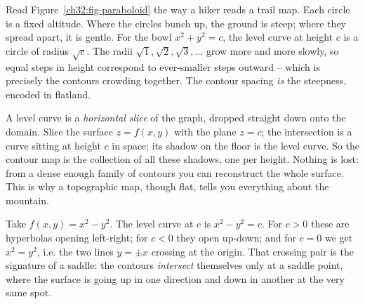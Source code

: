Read Figure~\ref{ch32:fig-paraboloid} the way a hiker reads a trail map. Each circle is a
fixed altitude. Where the circles bunch up, the ground is steep; where they spread apart, it
is gentle. For the bowl $x^2+y^2=c$, the level curve at height $c$ is a circle of radius
$\sqrt{c}$. The radii $\sqrt{1},\sqrt{2},\sqrt{3},\dots$ grow more and more slowly, so equal
steps in height correspond to ever-smaller steps outward -- which is precisely the contours
crowding together. The contour spacing \emph{is} the steepness, encoded in flatland.

\begin{happeningbox}
A level curve is a \emph{horizontal slice} of the graph, dropped straight down onto the
domain. Slice the surface $z=f(x,y)$ with the plane $z=c$; the intersection is a curve sitting
at height $c$ in space; its shadow on the floor is the level curve. So the contour map is the
collection of all these shadows, one per height. Nothing is lost: from a dense enough family
of contours you can reconstruct the whole surface. This is why a topographic map, though flat,
tells you everything about the mountain.
\end{happeningbox}

\begin{example}
\label{ch32:ex-saddle}
Take $f(x,y)=x^2-y^2$. The level curve at $c$ is $x^2-y^2=c$. For $c>0$ these are hyperbolas
opening left-right; for $c<0$ they open up-down; and for $c=0$ we get $x^2=y^2$, i.e. the two
lines $y=\pm x$ crossing at the origin. That crossing pair is the signature of a saddle: the
contours \emph{intersect} themselves only at a saddle point, where the surface is going up in
one direction and down in another at the very same spot.
\end{example}


